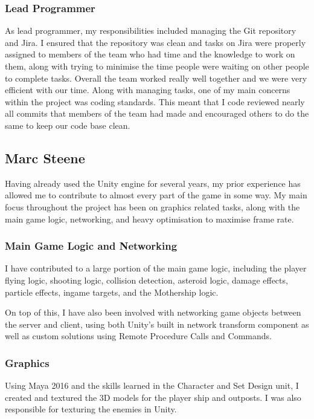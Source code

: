 \documentclass[a4paper,11pt]{article}
\begin{document}
\subsubsection{Lead Programmer}
As lead programmer, my responsibilities included managing the Git repository and Jira. I ensured that the repository was clean and tasks on Jira were properly assigned to members of the team who had time and the knowledge to work on them, along with trying to minimise the time people were waiting on other people to complete tasks. Overall the team worked really well together and we were very efficient with our time.
Along with managing tasks, one of my main concerns within the project was coding standards. This meant that I code reviewed nearly all commits that members of the team had made and encouraged others to do the same to keep our code base clean.

\clearpage

\subsection{Marc Steene}
Having already used the Unity engine for several years, my prior experience has allowed me to contribute to almost every part of the game in some way. My main focus throughout the project has been on graphics related tasks, along with the main game logic, networking, and heavy optimisation to maximise frame rate.

\subsubsection{Main Game Logic and Networking}
I have contributed to a large portion of the main game logic, including the player flying logic, shooting logic, collision detection, asteroid logic, damage effects, particle effects, ingame targets, and the Mothership logic.

On top of this, I have also been involved with networking game objects between the server and client, using both Unity’s built in network transform component as well as custom solutions using Remote Procedure Calls and Commands.

\subsubsection{Graphics}
Using Maya 2016 and the skills learned in the Character and Set Design unit, I created and textured the 3D models for the player ship and outposts. I was also responsible for texturing the enemies in Unity. 
\end{document}
